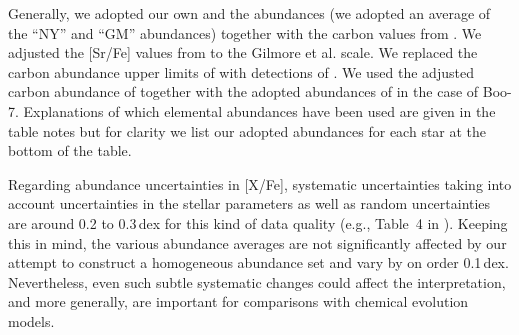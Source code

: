\documentclass[]{emulateapj}
\begin{document}
Generally, we adopted our own and the \citet{gilmore13} abundances (we
adopted an average of the ``NY'' and ``GM'' abundances) together with
the carbon values from \citet{norris10_booseg}. We adjusted the
[Sr/Fe] values from \citet{ishigaki14} to the Gilmore et al. scale. We
replaced the carbon abundance upper limits of \citet{ishigaki14} with
detections of \citet{norris10_booseg}. We used the adjusted carbon
abundance of \citet{norris10_booseg} together with the adopted
abundances of \citet{feltzing09} in the case of Boo-7.  Explanations
of which elemental abundances have been used are given in the table
notes but for clarity we list our adopted abundances for each star at
the bottom of the table.

Regarding abundance uncertainties in [X/Fe], systematic uncertainties
taking into account uncertainties in the stellar parameters as well as
random uncertainties are around 0.2 to 0.3\,dex for this kind of data
quality (e.g., Table~4 in \citealt{frebel14}). Keeping this in mind,
the various abundance averages are not significantly affected by our
attempt to construct a homogeneous abundance set and vary by on order
0.1\,dex. Nevertheless, even such subtle systematic changes could
affect the interpretation, and more generally, are important for
comparisons with chemical evolution models.
\end{document}
